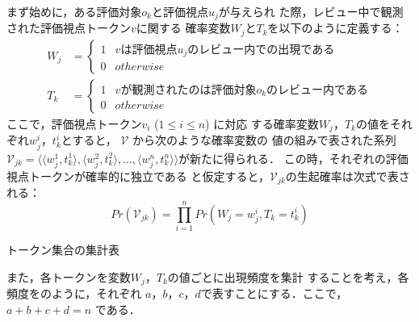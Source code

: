 \documentclass[japanese]{jnlp_1.4}
\def\tab#1{}
\begin{document}
まず始めに，ある評価対象$o_k$と評価視点$u_j$が与えられ
た際，レビュー中で観測された評価視点トークン$v$に関する
確率変数$W_j$と$T_k$を以下のように定義する：
\begin{align}
W_j & =\begin{cases}
1 & vは評価視点u_jのレビュー内での出現である\\
0 & otherwise
\end{cases}
\label{eq:w}\\
T_k & =\begin{cases}
1 & vが観測されたのは評価対象o_kのレビュー内である\\
0 & otherwise
\end{cases}
\end{align}
ここで，評価視点トークン$v_i$ ($1 \le i \le n$) に対応
する確率変数$W_j$，$T_k$の値をそれぞれ$w^i_j$，$t^i_k$とすると，
$\mathcal{V}$ から次のような確率変数の
値の組みで表された系列$\mathcal{V}_{jk} = \bigl\langle
\langle w^1_j, t^1_k \rangle ,\langle w^2_j, t^2_k
\rangle , ... , \langle w^n_j, t^n_k \rangle
\bigr\rangle$が新たに得られる．
この時，それぞれの評価視点トークンが確率的に独立である
と仮定すると，$\mathcal{V}_{jk}$の生起確率は次式で表される：
\begin{equation}
Pr(\mathcal{V}_{jk})= \prod_{i=1}^{n}Pr(W_j=w^i_j, T_k=t^i_k)
\end{equation}

\begin{table}[b]
\vspace{-1\Cvs}
\caption{トークン集合の集計表}

\end{table}

また，各トークンを変数$W_j$，$T_k$の値ごとに出現頻度を集計
\pagebreak
することを考え，各頻度を\tab{kankei}のように，それぞれ
$a$，$b$，$c$，$d$で表すことにする．ここで，$a + b + c
+ d = n$ である．
\end{document}
